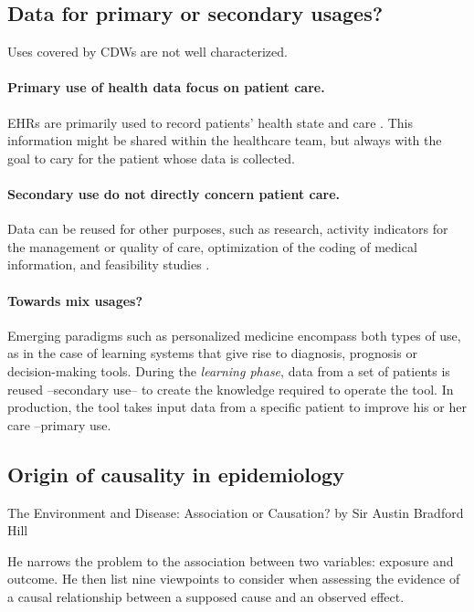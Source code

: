 % 


\subsection{Data for primary or secondary usages?}%
\label{subsec:cdw:data_usages}%

Uses covered by CDWs are not well characterized.

\paragraph{Primary use of health data focus on patient care.}
EHRs are primarily used to record patients' health state and care
\citep{safran_toward_2007,eu_primary_2022}. This information might be shared within the
healthcare team, but always with the goal to cary for the patient whose data is
collected.


\paragraph{Secondary use do not directly concern patient care.} Data can be
reused for other purposes, such as research, activity indicators for the
management or quality of care, optimization of the coding of medical
information, and feasibility studies
\citep{safran_toward_2007,cnil_referentiel_2021}.

\paragraph{Towards mix usages?}
Emerging paradigms such as personalized medicine encompass both types of use,
as in the case of learning systems that give rise to diagnosis, prognosis or
decision-making tools. During the \textit{learning phase}, data from a set of
patients is reused --secondary use-- to create the knowledge required to
operate the tool. In production, the tool takes input data from a specific
patient to improve his or her care --primary use.


\subsection{Origin of causality in epidemiology}%

The Environment and Disease: Association or Causation? by Sir Austin Bradford Hill

He narrows the problem to the association between two variables: exposure and
outcome. He then list nine viewpoints to consider when assessing the evidence of
a causal relationship between a supposed cause and an observed effect.

